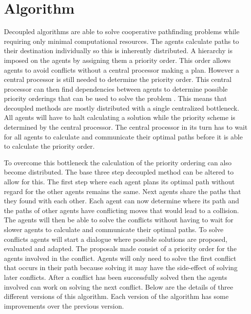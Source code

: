 \section{Algorithm}\label{sec:method}
Decoupled algorithms are able to solve cooperative pathfinding problems while
requiring only minimal computational resources. The agents calculate paths to
their destination individually so this is inherently distributed. A hierarchy
is imposed on the agents by assigning them a priority order. This order allows
agents to avoid conflicts without a central processor making a plan. However a
central processor is still needed to determine the priority order. This central
processor can then
find dependencies between agents to determine possible priority orderings that
can be used to solve the problem \cite{latombe1991,bennewitz2002}. This means
that decoupled methods are mostly distributed with a single centralized
bottleneck. All agents will have to halt calculating a solution while the
priority scheme is determined by the central processor. The central processor
in its turn has to wait for all agents to calculate and communicate their
optimal paths before it is able to calculate the priority order.

To overcome this bottleneck the calculation of the priority ordering can also
become distributed. The base three step decoupled method can be
altered to allow for this. The first step where each agent plans its optimal
path without regard for the other agents remains the same. Next agents share
the paths that they found with each other. Each agent can now determine where
its path and the paths of other agents
have conflicting moves that would lead to a collision. The agents will then be
able to solve the conflicts without having to wait for slower agents to
calculate and communicate their optimal paths. To solve conflicts agents will
start a dialogue where possible solutions are proposed, evaluated and adapted.
The proposals made consist of a priority order for the agents involved in the
conflict. Agents will only need to solve the first conflict that occurs in
their path because solving it may have the side-effect of solving later
conflicts. After a conflict has been successfully solved then the agents
involved can work on solving the next conflict.
Below are the details of three different versions of this algorithm. Each
version of the algorithm has some improvements over the previous version.

